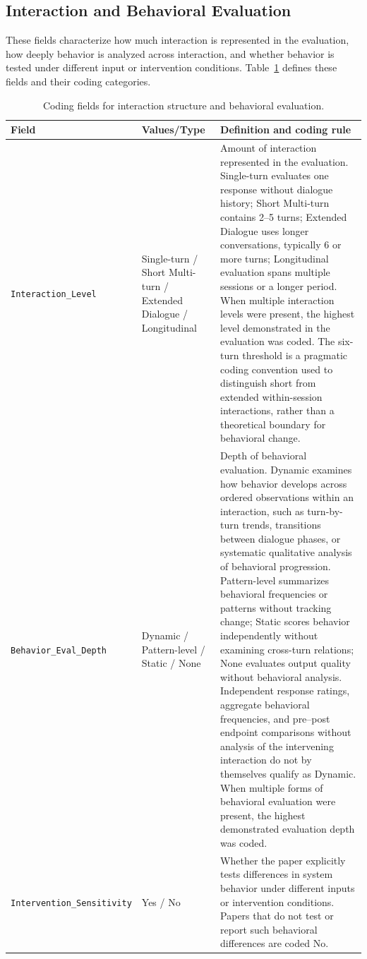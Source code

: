 \subsection{Interaction and Behavioral Evaluation}

These fields characterize how much interaction is represented in the evaluation, how deeply behavior is analyzed across interaction, and whether behavior is tested under different input or intervention conditions. 
Table~\ref{tab:codebook-behavior} defines these fields and their coding categories.

\begin{table}[p]
\centering
\begin{tabular}{p{4.3cm}p{1.9cm}p{8.5cm}}
\toprule
\textbf{Field} & \textbf{Values/Type} & \textbf{Definition and coding rule} \\
\midrule

\texttt{Interaction\_Level}
&
Single-turn / Short Multi-turn / Extended Dialogue / Longitudinal
&
Amount of interaction represented in the evaluation. Single-turn evaluates one response without dialogue history; Short Multi-turn contains 2--5 turns; Extended Dialogue uses longer conversations, typically 6 or more turns; Longitudinal evaluation spans multiple sessions or a longer period. When multiple interaction levels were present, the highest level demonstrated in the evaluation was coded. 
The six-turn threshold is a pragmatic coding convention used to distinguish short from extended within-session interactions, rather than a theoretical boundary for behavioral change.
\\
\midrule

\texttt{Behavior\_Eval\_Depth}
&
Dynamic / Pattern-level / Static / None
&
Depth of behavioral evaluation.
Dynamic examines how behavior develops across ordered observations within an interaction, such as turn-by-turn trends, transitions between dialogue phases, or systematic qualitative analysis of behavioral progression.
Pattern-level summarizes behavioral frequencies or patterns without tracking change; Static scores behavior independently without examining cross-turn relations; None evaluates output quality without behavioral analysis.
Independent response ratings, aggregate behavioral frequencies, and pre--post endpoint comparisons without analysis of the intervening interaction do not by themselves qualify as Dynamic.
When multiple forms of behavioral evaluation were present, the highest demonstrated evaluation depth was coded.
\\
\midrule

\texttt{Intervention\_Sensitivity}
&
Yes / No
&
Whether the paper explicitly tests differences in system behavior under different inputs or intervention conditions. Papers that do not test or report such behavioral differences are coded No.
\\

\bottomrule
\end{tabular}
\caption{Coding fields for interaction structure and behavioral evaluation.}
\label{tab:codebook-behavior}
\end{table}


